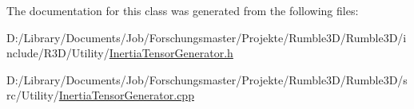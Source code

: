 The documentation for this class was generated from the following files\+:\begin{DoxyCompactItemize}
\item 
D\+:/\+Library/\+Documents/\+Job/\+Forschungsmaster/\+Projekte/\+Rumble3\+D/\+Rumble3\+D/include/\+R3\+D/\+Utility/\mbox{\hyperlink{_inertia_tensor_generator_8h}{Inertia\+Tensor\+Generator.\+h}}\item 
D\+:/\+Library/\+Documents/\+Job/\+Forschungsmaster/\+Projekte/\+Rumble3\+D/\+Rumble3\+D/src/\+Utility/\mbox{\hyperlink{_inertia_tensor_generator_8cpp}{Inertia\+Tensor\+Generator.\+cpp}}\end{DoxyCompactItemize}
